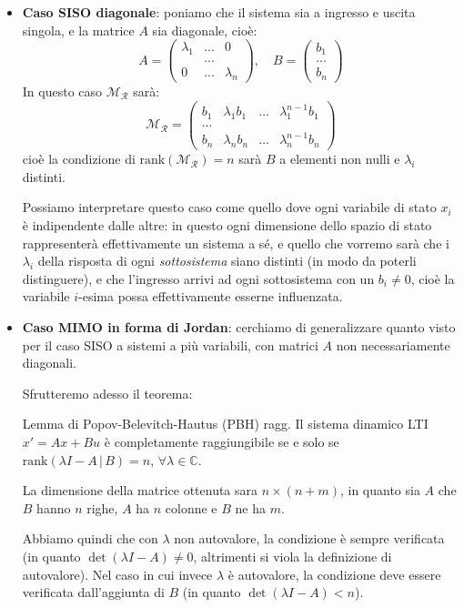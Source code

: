 \documentclass[a4paper,11pt]{article}
\begin{document}
\begin{itemize}
	\item \textbf{Caso SISO diagonale}: poniamo che il sistema sia a ingresso e uscita singola, e la matrice $A$ sia diagonale, cioè:
		$$
			A = \begin{pmatrix}
				\lambda_1 & ... & 0 \\
				& ... & \\ 
				0 & ... & \lambda_n
			\end{pmatrix}, \quad B = \begin{pmatrix}
				b_1 \\ ... \\ b_n
			\end{pmatrix}
		$$
		In questo caso $\mathcal{M}_\mathcal{R}$ sarà:
		$$
		\mathcal{M}_\mathcal{R} = \begin{pmatrix}
			b_1 & \lambda_1 b_1 & ... & \lambda_1^{n - 1} b_1 \\
			... \\
			b_n & \lambda_n b_n & ... & \lambda_n^{n - 1} b_n
		\end{pmatrix}
		$$
		cioè la condizione di $\mathrm{rank}(\mathcal{M}_\mathcal{R}) = n$ sarà $B$ a elementi non nulli e $\lambda_i$ distinti.

		Possiamo interpretare questo caso come quello dove ogni variabile di stato $x_i$ è indipendente dalle altre: in questo ogni dimensione dello spazio di stato rappresenterà effettivamente un sistema a sé, e quello che vorremo sarà che i $\lambda_i$ della risposta di ogni \textit{sottosistema} siano distinti (in modo da poterli distinguere), e che l'ingresso arrivi ad ogni sottosistema con un $b_i \neq 0$, cioè la variabile $i$-esima possa effettivamente esserne influenzata.
	\item \textbf{Caso MIMO in forma di Jordan}: cerchiamo di generalizzare quanto visto per il caso SISO a sistemi a più variabili, con matrici $A$ non necessariamente diagonali.

		Sfrutteremo adesso il teorema:
		\begin{theorem}{Lemma di Popov-Belevitch-Hautus (PBH) ragg.}
			Il sistema dinamico LTI $x' = Ax + Bu$ è completamente raggiungibile se e solo se $\mathrm{rank}(\lambda I - A \, | \, B) = n$, $\forall \lambda \in \mathbb{C}$.
		\end{theorem}
		La dimensione della matrice ottenuta sara $n \times (n + m)$, in quanto sia $A$ che $B$ hanno $n$ righe, $A$ ha $n$ colonne e $B$ ne ha $m$.

		Abbiamo quindi che con $\lambda$ non autovalore, la condizione è sempre verificata (in quanto $\det(\lambda I - A) \neq 0$, altrimenti si viola la definizione di autovalore).
		Nel caso in cui invece $\lambda$ è autovalore, la condizione deve essere verificata dall'aggiunta di $B$ (in quanto $\det(\lambda I - A) < n$).


\end{itemize}
\end{document}
